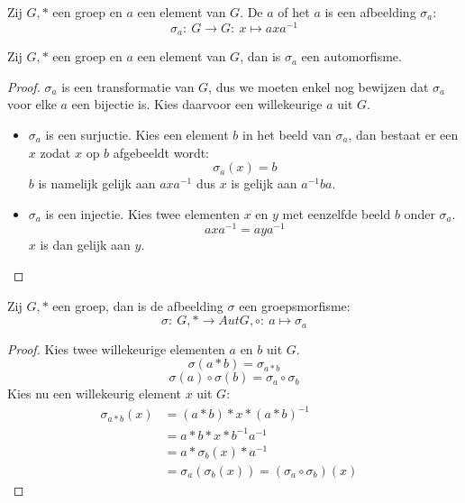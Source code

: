 \documentclass[main.tex]{subfiles}
\begin{document}
\begin{de}
  \label{de:sigma-a}
  Zij $G,*$ een groep en $a$ een element van $G$.
  De  $a$ of het  $a$ is een afbeelding $\sigma_{a}$:
  \[ \sigma_{a}:\ G \rightarrow G:\ x \mapsto axa^{-1} \]
\end{de}

\begin{ei}
  Zij $G,*$ een groep en $a$ een element van $G$, dan is $\sigma_{a}$ een automorfisme.
  
  \begin{proof}
    $\sigma_{a}$ is een transformatie van $G$, dus we moeten enkel nog bewijzen dat $\sigma_{a}$ voor elke $a$ een bijectie is.
    Kies daarvoor een willekeurige $a$ uit $G$.
    \begin{itemize}
    \item $\sigma_{a}$ is een surjuctie.
      Kies een element $b$ in het beeld van $\sigma_{a}$, dan bestaat er een $x$ zodat $x$ op $b$ afgebeeldt wordt:
      \[ \sigma_{a}(x) = b \]
      $b$ is namelijk gelijk aan $axa^{-1}$ dus $x$ is gelijk aan $a^{-1}ba$.
    \item $\sigma_{a}$ is een injectie.
      Kies twee elementen $x$ en $y$ met eenzelfde beeld $b$ onder $\sigma_{a}$.
      \[ axa^{-1} = aya^{-1} \]
      $x$ is dan gelijk aan $y$.
    \end{itemize}
  \end{proof}
\end{ei}

\begin{ei}
  \examen
  Zij $G,*$ een groep, dan is de afbeelding $\sigma$ een groepsmorfisme:
  \[ \sigma:\ G,* \rightarrow Aut G,\circ:\ a \mapsto \sigma_{a} \]

  \begin{proof}
    Kies twee willekeurige elementen $a$ en $b$ uit $G$.
    \[ \sigma(a * b) = \sigma_{a * b}\]
    \[ \sigma(a) \circ \sigma(b) = \sigma_{a} \circ \sigma_{b} \]
    Kies nu een willekeurig element $x$ uit $G$:
    \[
    \begin{array}{rll}
      \sigma_{a * b}(x) &= (a*b)*x*(a*b)^{-1} &\\
                       &= a*b*x*b^{-1}a^{-1} &\\
                       &= a*\sigma_{b}(x)*a^{-1} &\\
                       &= \sigma_{a}(\sigma_{b}(x)) = (\sigma_{a} \circ \sigma_{b})(x)      
    \end{array}
    \]
  \end{proof}
\end{ei}
\end{document}
